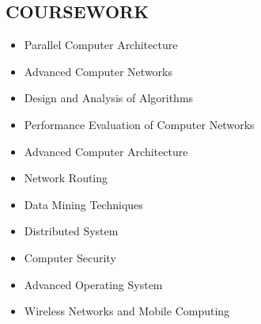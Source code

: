 \documentclass[zhemargin]{res}
\begin{document}
\begin{resume}
\section{COURSEWORK} 
	\begin{itemize}[leftmargin=*]
	\item Parallel Computer Architecture
	\item Advanced Computer Networks
	\item Design and Analysis of Algorithms
    \item Performance Evaluation of Computer Networks
    \item Advanced Computer Architecture
    \item Network Routing
	\item Data Mining Techniques
	\item Distributed System
	\item Computer Security
	\item Advanced Operating System
    \item Wireless Networks and Mobile Computing
	\end{itemize}
\end{resume}
\end{document}
